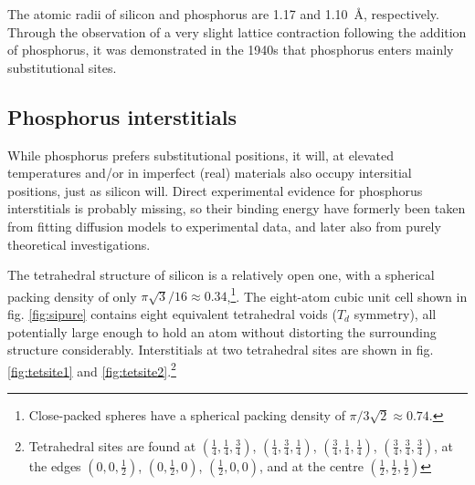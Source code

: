 \documentclass[11pt,bibliography=totoc,index=totoc]{scrbook}   %
\begin{document}

The atomic radii of silicon and phosphorus are 1.17 and 1.10~Å, respectively.
Through the observation of a very slight lattice contraction following the addition of phosphorus,
it was demonstrated in the 1940s that phosphorus enters mainly substitutional sites.\cite{Pearson:1949}




%
\subsection{Phosphorus interstitials}
%

While phosphorus prefers substitutional positions, it will, at elevated temperatures and/or in imperfect (real) materials also occupy intersitial positions, just as silicon will.
Direct experimental evidence for phosphorus interstitials is probably missing, so their binding energy have formerly been taken from fitting diffusion models to experimental data, and later also from purely theoretical investigations.\cite[391]{Pichler:2004}

The tetrahedral structure of silicon is a relatively open one, with a spherical packing density of only $\pi\sqrt{3}/16\approx 0.34$,\footnote{Close-packed spheres have a spherical packing density of $\pi/3\sqrt{2} \approx 0.74$.}.
The eight-atom cubic unit cell shown in fig. \ref{fig:sipure} contains eight equivalent tetrahedral voids ($T_d$ symmetry), all potentially large enough to hold an atom without distorting the surrounding structure considerably.
Interstitials at two tetrahedral sites are shown in fig. \ref{fig:tetsite1} and \ref{fig:tetsite2}.\footnote{Tetrahedral sites are found at
$(\frac{1}{4},\frac{1}{4},\frac{3}{4})$, 
$(\frac{1}{4},\frac{3}{4},\frac{1}{4})$, 
$(\frac{3}{4},\frac{1}{4},\frac{1}{4})$, 
$(\frac{3}{4},\frac{3}{4},\frac{3}{4})$, 
at the edges
$(0,0,\frac{1}{2})$,
$(0,\frac{1}{2},0)$,
$(\frac{1}{2},0,0)$,
and at the centre
$(\frac{1}{2},\frac{1}{2},\frac{1}{2})$}
\end{document}
